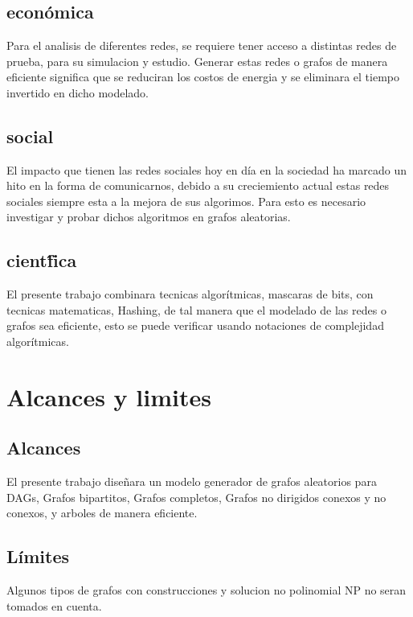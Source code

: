 \documentclass[11pt]{extarticle}
\begin{document}
\section{\justificacion}
  \subsection{\justificacion econ\'omica}
    Para el analisis de diferentes redes, se requiere tener acceso a distintas redes de prueba, para su simulacion y estudio.
    Generar  estas redes o grafos de manera eficiente significa que se reduciran los costos de energia y se
    eliminara el tiempo invertido en dicho modelado.
  \subsection{\justificacion social}
    El impacto que tienen las redes sociales hoy en d\'ia en la sociedad ha marcado un hito en la forma de comunicarnos,
    debido a su creciemiento actual estas redes sociales siempre esta a la mejora de sus algorimos.
    Para esto es necesario investigar y probar dichos algoritmos en grafos aleatorias.
  \subsection{\justificacion cient\'fica}
    El presente trabajo combinara tecnicas algor\'itmicas, mascaras de bits, con tecnicas
    matematicas, Hashing, de tal manera que el modelado de las redes o grafos sea eficiente,
    esto se puede verificar usando notaciones de complejidad algor\'itmicas.
\section{Alcances y limites}
  \subsection{Alcances}
    \begin{itemize}
      \guion El presente trabajo diseñara un modelo generador de grafos aleatorios
            para DAGs, Grafos bipartitos, Grafos completos, Grafos no dirigidos
            conexos y no conexos, y arboles de manera eficiente.
      \end{itemize}
  \subsection{L\'imites}
    \begin{itemize}
      \guion Algunos tipos de grafos con construcciones y solucion no polinomial NP no seran tomados en cuenta.
    \end{itemize}
\end{document}

